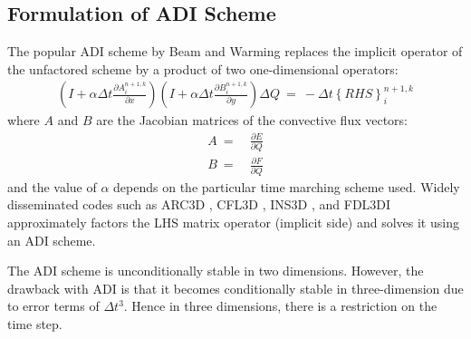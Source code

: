 \documentclass[conf]{new-aiaa}
\begin{document}
\subsection{Formulation of ADI Scheme}

The popular ADI scheme by Beam and Warming \cite{Beam} replaces the implicit operator of the unfactored scheme by a product of two one-dimensional operators: 
\begin{equation}
	\begin{split}
		\label{eq:ADI}
  			\left(I+\alpha\Delta{t}\frac{\partial{A_i^{n+1,k}}}{\partial{x}}\right)\left(I+\alpha\Delta{t}\frac{\partial{B_i^{n+1,k}}}{\partial{y}}\right)\Delta{Q}~=~-\Delta{t}\left\{RHS\right\}_i^{n+1, k}
	\end{split}
\end{equation}
where $A$ and $B$ are the Jacobian matrices of the convective flux vectors:
\begin{equation}
	\begin{split}
		\label{eq:}
  			A~=&~\frac{\partial{E}}{\partial{Q}} \\
  			B~=&~\frac{\partial{F}}{\partial{Q}}
	\end{split}
\end{equation}
and the value of $\alpha$ depends on the particular time marching scheme used. Widely disseminated codes such as ARC3D \cite{ARC3D}, CFL3D \cite{CFL3D}, INS3D \cite{INS3D}, and FDL3DI \cite{FDL3DI_A, FDL3DI_B, FDL3DI_C} approximately factors the LHS matrix operator (implicit side) and solves it using an ADI scheme. 

The ADI scheme is unconditionally stable in two dimensions. However, the drawback with ADI is that it becomes conditionally stable in three-dimension due to error terms of $\Delta{t}^3$. 
Hence in three dimensions, there is a restriction on the time step.
\end{document}
